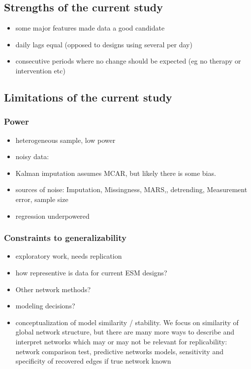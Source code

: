 \documentclass[
  english,
  man]{apa6}
\providecommand{\tightlist}{%
  \setlength{\itemsep}{0pt}\setlength{\parskip}{0pt}}
\begin{document}
\hypertarget{strengths-of-the-current-study}{%
\subsection{Strengths of the current study}\label{strengths-of-the-current-study}}

\begin{itemize}
\tightlist
\item
  some major features made data a good candidate
\item
  daily lags equal (opposed to designs using several per day)
\item
  consecutive periods where no change should be expected (eg no therapy or intervention etc)
\end{itemize}

\hypertarget{limitations-of-the-current-study}{%
\subsection{Limitations of the current study}\label{limitations-of-the-current-study}}

\hypertarget{power}{%
\subsubsection{Power}\label{power}}

\begin{itemize}
\tightlist
\item
  heterogeneous sample, low power
\item
  noisy data:
\item
  Kalman imputation assumes MCAR, but likely there is some bias.
\item
  sources of noise: Imputation, Missingness, MARS,, detrending, Measurement error, sample size
\item
  regression underpowered
\end{itemize}

\hypertarget{constraints-to-generalizability}{%
\subsubsection{Constraints to generalizability}\label{constraints-to-generalizability}}

\begin{itemize}
\tightlist
\item
  exploratory work, needs replication
\item
  how representive is data for current ESM designs?
\item
  Other network methods?
\item
  modeling decisions?
\item
  conceptualization of model similarity / stability. We focus on similarity of global network structure, but there are many more ways to describe and interpret networks which may or may not be relevant for replicability: network comparison test, predictive networks models, sensitivity and specificity of recovered edges if true network known
\end{itemize}
\end{document}
